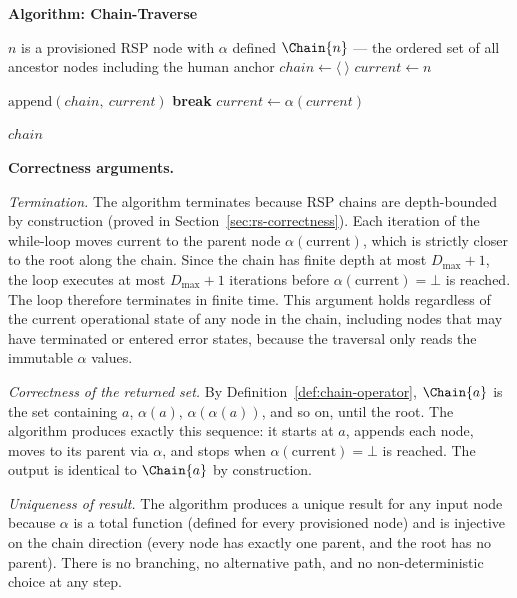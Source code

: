 \medskip
\noindent\textbf{Algorithm: Chain-Traverse}

\begin{algorithm}
\caption{Chain-Traverse($n$) --- Build the delegation chain from node $n$ to the human anchor}
\label{alg:chain-traverse}
\begin{algorithmic}[1]
\REQUIRE $n$ is a provisioned RSP node with $\alpha$ defined
\ENSURE $\Chain{n}$ --- the ordered set of all ancestor nodes including the human anchor
\STATE $chain \leftarrow \langle\ \rangle$ 
\STATE $current \leftarrow n$ 

    \STATE $\text{append}(chain,\ current)$ 
        \STATE \textbf{break} 
    \ENDIF
    \STATE $current \leftarrow \alpha(current)$ 
\ENDWHILE

\RETURN $chain$
\end{algorithmic}
\end{algorithm}

\bigskip
\noindent\textbf{Correctness arguments.}

\textit{Termination.} The algorithm terminates because RSP chains are depth-bounded by construction (proved in Section~\ref{sec:rs-correctness}). Each iteration of the while-loop moves $\text{current}$ to the parent node $\alpha(\text{current})$, which is strictly closer to the root along the chain. Since the chain has finite depth at most $D_{\max} + 1$, the loop executes at most $D_{\max} + 1$ iterations before $\alpha(\text{current}) = \bot$ is reached. The loop therefore terminates in finite time. This argument holds regardless of the current operational state of any node in the chain, including nodes that may have terminated or entered error states, because the traversal only reads the immutable $\alpha$ values.

\textit{Correctness of the returned set.} By Definition~\ref{def:chain-operator}, $\Chain{a}$ is the set containing $a$, $\alpha(a)$, $\alpha(\alpha(a))$, and so on, until the root. The algorithm produces exactly this sequence: it starts at $a$, appends each node, moves to its parent via $\alpha$, and stops when $\alpha(\text{current}) = \bot$ is reached. The output is identical to $\Chain{a}$ by construction.

\textit{Uniqueness of result.} The algorithm produces a unique result for any input node because $\alpha$ is a total function (defined for every provisioned node) and is injective on the chain direction (every node has exactly one parent, and the root has no parent). There is no branching, no alternative path, and no non-deterministic choice at any step.

